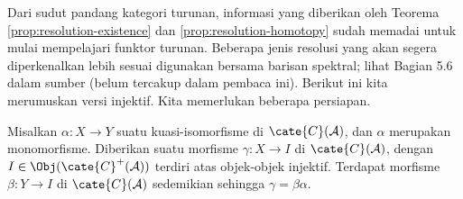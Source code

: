Dari sudut pandang kategori turunan, informasi yang diberikan oleh Teorema \ref{prop:resolution-existence} dan \ref{prop:resolution-homotopy} sudah memadai untuk mulai mempelajari funktor turunan. Beberapa jenis resolusi yang akan segera diperkenalkan lebih sesuai digunakan bersama barisan spektral; lihat Bagian 5.6 dalam sumber (belum tercakup dalam pembaca ini). Berikut ini kita merumuskan versi injektif. Kita memerlukan beberapa persiapan.

\begin{lema}\label{prop:ext-alpha-beta}
	Misalkan $\alpha: X \to Y$ suatu kuasi-isomorfisme di $\cate{C}(\mathcal{A})$, dan $\alpha$ merupakan monomorfisme. Diberikan suatu morfisme $\gamma: X \to I$ di $\cate{C}(\mathcal{A})$, dengan $I \in \Obj(\cate{C}^+(\mathcal{A}))$ terdiri atas objek-objek injektif. Terdapat morfisme $\beta: Y \to I$ di $\cate{C}(\mathcal{A})$ sedemikian sehingga $\gamma = \beta\alpha$.
\end{lema}
